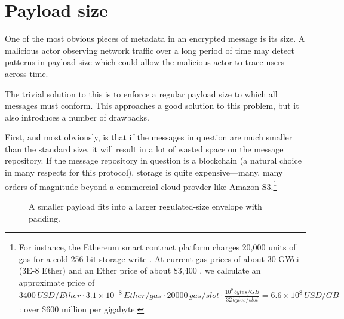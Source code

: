 \section{Payload size}\label{payload-size}

One of the most obvious pieces of metadata in an encrypted message is its size. A malicious actor observing network traffic over a long period of time may detect patterns in payload size which could allow the malicious actor to trace users across time.

The trivial solution to this is to enforce a regular payload size to which all messages must conform. This approaches a good solution to this problem, but it also introduces a number of drawbacks.

First, and most obviously, is that if the messages in question are much smaller than the standard size, it will result in a lot of wasted space on the message repository. If the message repository in question is a blockchain (a natural choice in many respects for this protocol), storage is quite expensive---many, many orders of magnitude beyond a commercial cloud provder like Amazon S3.\footnote{For instance, the Ethereum smart contract platform  charges 20,000 units of gas for a cold 256-bit storage write \parencite[][Appendix G]{wood_ethereum_2025}. At current gas prices of about 30 GWei (3E-8 Ether) \parencite{etherscanio_gastracker} and an Ether price of about \$3,400 \parencite{coingecko_ethereum_2025}, we calculate an approximate price of $3400 \si{\,USD\per Ether} \cdot 3.1 \times 10^{-8} \si{\,Ether\per gas} \cdot 20000 \si{\,gas\per slot} \cdot \frac{10^9 \si{\,bytes\per GB}}{32 \si{\,bytes\per slot}} = 6.6 \times 10^8 \si{\,USD\per GB}$: over \$600 million per gigabyte.}

\begin{figure}[h!]
    \centering
    \caption{A smaller payload fits into a larger regulated-size envelope with padding.}
    \label{fig:payload_size}
\end{figure}

